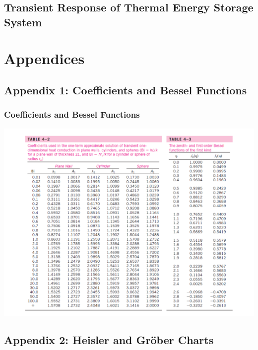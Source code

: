 \documentclass[10pt,compress]{beamer}
\begin{document}
\subsection{Transient Response of Thermal Energy Storage System}










\section{Appendices}

\subsection{Appendix 1: Coefficients and Bessel Functions}\label{appendix1}
\begin{frame}
 \frametitle{Coefficients and Bessel Functions}
        \begin{center}
          \includegraphics[width=.9\columnwidth,height=.65\columnwidth,clip]{./Pics/BaselFunctionTable}
        \end{center}
\end{frame}




\subsection{Appendix 2: Heisler and Gr\"ober Charts}\label{appendix2}
{
  
}
\end{document}

